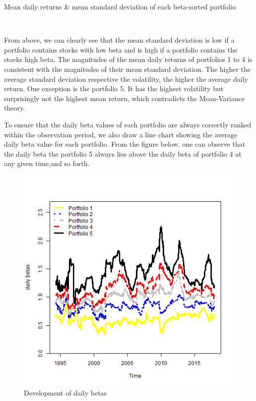 \documentclass[12pt,a4paper]{article}
\begin{document}
\makeatletter{}\makeatother
\centering
{}
\caption{Mean daily returns \& mean standard deviation of each beta-sorted portfolio}
\label{tab:my-table}

~\\
\begin{justify}
From above, we can clearly see that the mean standard deviation is low if a portfolio contains stocks with low beta and is high if a portfolio contains the stocks high beta. The magnitudes of the mean daily returns of portfolios 1 to 4 is consistent with the magnitudes of their mean standard deviation. The higher the average standard deviation respective the volatility, the higher the average daily return. One exception is the portfolio 5. It has the highest volatility but surprisingly not the highest mean return, which contradicts the Mean-Variance theory.

To ensure that the daily beta values of each portfolio are always correctly ranked within the observation period, we also draw a line chart showing the average daily beta value for each portfolio. From the figure below, one can observe that the daily beta the portfolio 5 always lies above the daily beta of portfolio 4 at any given time,and so forth.

\begin{figure}[H]
\centering
\includegraphics[width=1\textwidth,height=0.8\textwidth]{daily betas}
\caption{Development of daily betas}
\label{fig:Development of daily betas}
\end{figure}


\end{justify}
\end{document}
